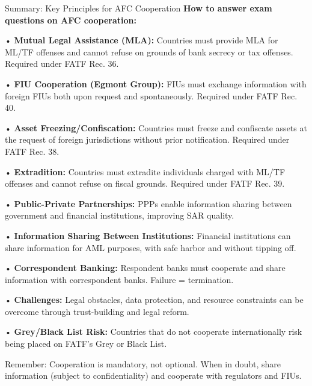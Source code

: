 \documentclass[11pt,a4paper]{beamer}
\begin{document}
\begin{frame}{Summary: Key Principles for AFC Cooperation}
\tiny
\noindent\textbf{How to answer exam questions on AFC cooperation:}

\vspace{0.1cm}
\noindent• \textbf{Mutual Legal Assistance (MLA):} Countries must provide MLA for ML/TF offenses and cannot refuse on grounds of bank secrecy or tax offenses. Required under FATF Rec. 36.

\vspace{0.1cm}
\noindent• \textbf{FIU Cooperation (Egmont Group):} FIUs must exchange information with foreign FIUs both upon request and spontaneously. Required under FATF Rec. 40.

\vspace{0.1cm}
\noindent• \textbf{Asset Freezing/Confiscation:} Countries must freeze and confiscate assets at the request of foreign jurisdictions without prior notification. Required under FATF Rec. 38.

\vspace{0.1cm}
\noindent• \textbf{Extradition:} Countries must extradite individuals charged with ML/TF offenses and cannot refuse on fiscal grounds. Required under FATF Rec. 39.

\vspace{0.1cm}
\noindent• \textbf{Public-Private Partnerships:} PPPs enable information sharing between government and financial institutions, improving SAR quality.

\vspace{0.1cm}
\noindent• \textbf{Information Sharing Between Institutions:} Financial institutions can share information for AML purposes, with safe harbor and without tipping off.

\vspace{0.1cm}
\noindent• \textbf{Correspondent Banking:} Respondent banks must cooperate and share information with correspondent banks. Failure = termination.

\vspace{0.1cm}
\noindent• \textbf{Challenges:} Legal obstacles, data protection, and resource constraints can be overcome through trust-building and legal reform.

\vspace{0.1cm}
\noindent• \textbf{Grey/Black List Risk:} Countries that do not cooperate internationally risk being placed on FATF's Grey or Black List.

\vspace{0.3cm}
\centering
{Remember: Cooperation is mandatory, not optional. When in doubt, share information (subject to confidentiality) and cooperate with regulators and FIUs.}
\end{frame}
\end{document}
